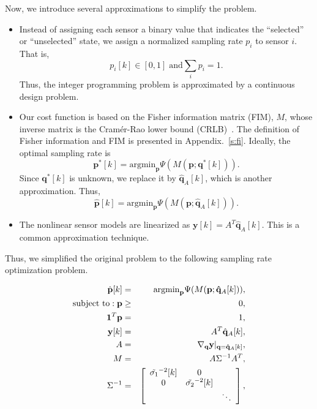 Now, we introduce several approximations to simplify the problem.
\begin{itemize}
  \item Instead of assigning each sensor a binary value that indicates the ``selected'' or ``unselected'' state, we assign a normalized sampling rate $p_i$ to sensor $i$. That is, $$p_i[k]\in [0,1] \;\mathrm{ and } \sum_i p_i=1.$$ Thus, the integer programming problem is approximated by a continuous design problem.
       \item Our cost function is based on the Fisher information matrix (FIM), $M$, whose inverse matrix is the Cram\'{e}r-Rao lower bound (CRLB)~\cite{CheungLSTOA04,UcinskiOptDPS05}.
   The definition of Fisher information and FIM is presented in Appendix.~\ref{s:fi}.
    Ideally, the optimal sampling rate is
    $$\mathbf{p}^\ast[k]=\mathrm{argmin}_{\mathbf{p}} \Psi(M(\mathbf{p};\mathbf{q}^\ast[k])).$$ Since $\mathbf{q}^\ast[k]$ is unknown, we replace it by $\hat{\mathbf{q}}_A[k]$, which is another approximation. Thus, $$\hat{\mathbf{p}}[k]=\mathrm{argmin}_{\mathbf{p}} \Psi(M(\mathbf{p};\hat{\mathbf{q}}_A[k])).$$
        \item The nonlinear sensor models are linearized as $\mathbf{y}[k] = A^T \hat{\mathbf{q}}_A[k].$ This is a common approximation technique.
\end{itemize}
Thus, we simplified the original problem to the following sampling rate optimization problem.
\begin{mdef}\label{d:SampRateOpt}
\begin{eqnarray}
 \hat{\mathbf{p}}[k]  &=&  \mathrm{argmin}_{\mathbf{p}} \Psi(M(\mathbf{p}; \mathbf{\hat{q}}_A[k])),  \label{e:pk}\\
 \hbox{\rm subject to} :  \mathbf{p} &\geq& 0 ,  \nonumber \\
 \mathbf{1}^{T}\mathbf{p} & = & 1 , \nonumber \\
 \mathbf{y}[k] &=& A^T \hat{\mathbf{q}}_A[k],\nonumber \\
 A &=&  \nabla_{\mathbf{q}}\mathbf{y}|_{\mathbf{q}=\mathbf{\hat{q}}_A[k]}, \label{e:defA} \\
 M &=&  A \Sigma^{-1}A^T , \label{e:mSSP}\\
 \Sigma^{-1} & =& \left[\begin{array}{ccc}
        \tilde{\sigma_{1}}^{-2}[k] & 0\\
        0 & \tilde{\sigma_{2}}^{-2}[k] \\
        &  & \ddots\end{array}\right], \nonumber
 \end{eqnarray}
\end{mdef}
